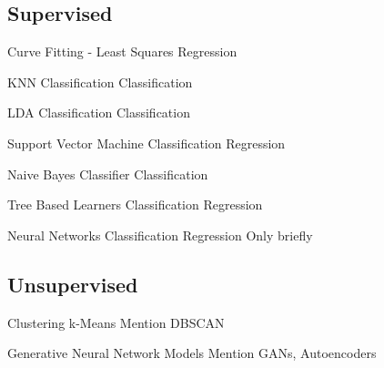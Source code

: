   \subsection{Supervised}

  \begin{frame}{Curve Fitting - Least Squares}
  Regression
  \end{frame}

  \begin{frame}{KNN Classification}
  Classification
  \end{frame}

  \begin{frame}{LDA Classification}
  Classification
  \end{frame}

  \begin{frame}{Support Vector Machine}
  Classification
  Regression
  \end{frame}

  \begin{frame}{Naive Bayes Classifier}
  Classification
  \end{frame}

  \begin{frame}{Tree Based Learners}
  Classification
  Regression
  \end{frame}

  \begin{frame}{Neural Networks}
  Classification
  Regression
  Only briefly
  \end{frame}

  \subsection{Unsupervised}

  \begin{frame}{Clustering}
  k-Means
  Mention DBSCAN
  \end{frame}

  \begin{frame}{Generative Neural Network Models}
  Mention GANs, Autoencoders
  \end{frame}




